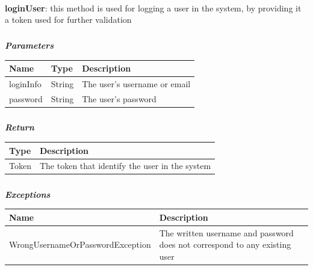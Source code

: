 					\paragraph{}
							\textbf{loginUser}: this method is used for logging a user in the system, by providing it a token used for further validation
							\subparagraph{}
							\textit{\textbf{Parameters}}
								\begin{table}[!h]
									\begin{tabular}{L{0.2\textwidth}L{0.2\textwidth}L{0.2\textwidth}}
										\toprule
										Name & Type & Description \\
										\midrule
								  		loginInfo & String & The user's username or email \\
								  		password & String & The user's password \\
								 		\bottomrule
									\end{tabular}
								\end{table}
							\subparagraph{}
								\textit{\textbf{Return}}
									\begin{table}[!h]
									\begin{tabular}{L{0.3\textwidth}L{0.3\textwidth}}
										\toprule
										Type & Description \\
										\midrule
								  		Token & The token that identify the user in the system \\
								  		\bottomrule
									\end{tabular}
								\end{table}
							\subparagraph{}
								\textit{\textbf{Exceptions}}
									\begin{table}[!h]
									\begin{tabular}{L{0.3\textwidth}L{0.3\textwidth}}
										\toprule
										Name & Description \\
										\midrule
								  	WrongUsernameOrPasswordException & The written username and password does not correspond to any existing user \\
								 		\bottomrule
									\end{tabular}
								\end{table}
								
